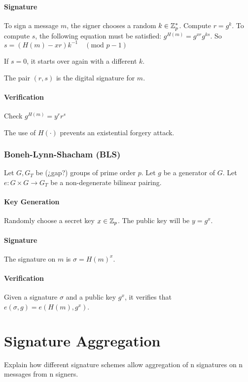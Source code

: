 \paragraph{Signature}

To sign a message $m$, the signer chooses a random $k \in {\mathbb Z}_p^\ast$.
Compute $ r = g^k$. To compute $s$, the following equation must be satisfied: $g^{H(m)} = g^{xr} g^{ks}$.
So $s = \left( H(m) - xr \right) k^{-1} \quad (\text{mod } p-1)$

If $s=0$, it starts over again with a different $k$.

The pair $(r,s)$ is the digital signature for $m$.

\paragraph{Verification}

Check $g^{H(m)} = y^r r^s$

The use of $H( \cdot )$ prevents an existential forgery attack.

\subsubsection{Boneh-Lynn-Shacham (BLS)}
\cite{BonehLS01}
Let $G,G_T$ be (¿gap?) groups of prime order $p$. Let $g$ be a generator of $G$. Let $e:G \times G \rightarrow G_T$ be a non-degenerate bilinear pairing.
\paragraph{Key Generation}

Randomly choose a secret key $x \in {\mathbb Z}_p$. The public key will be $y = g^x$.

\paragraph{Signature}

The signature on $m$ is $\sigma = H(m)^x$.

\paragraph{Verification}

Given a signature $\sigma$ and a public key $g^x$, it verifies that $e(\sigma,g) = e \left( H(m), g^x \right)$.

\section{Signature Aggregation}
Explain how different signature schemes allow aggregation of n signatures on n messages from n signers.

